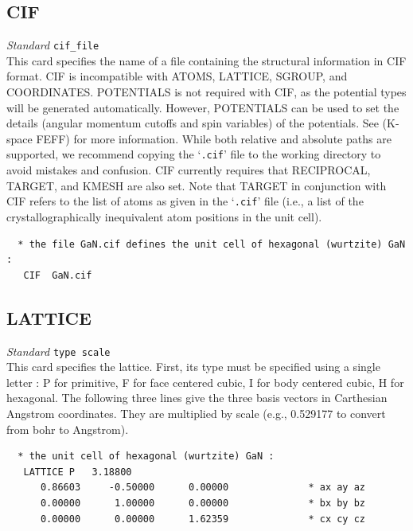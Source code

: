 \documentclass[11pt,oneside]{report} %
\newenvironment{Card}[4]%
      {\vspace{3ex}%
        \subsection{#1}
        \quad\textsl{#3}\newline
        \quad\texttt{#2}\newline%
        \label{card:#4}\\}
      {}
\newcommand{\file}[1]{`\texttt{#1}'}
\begin{document}
\begin{Card}{CIF}{cif\_file}{Standard}{cif}
This card specifies the name of a file containing the structural information in CIF format.  CIF is incompatible with ATOMS, LATTICE, SGROUP, and COORDINATES.  POTENTIALS is not required with CIF, as the potential types will be generated automatically.  However, POTENTIALS can be used to set the details (angular momentum cutoffs and spin variables) of the potentials.  See (K-space FEFF) for more information.
While both relative and absolute paths are supported, we recommend copying the \file{.cif} file to the working directory to avoid mistakes and confusion.
CIF currently requires that RECIPROCAL, TARGET, and KMESH are also set.  Note that TARGET in conjunction with CIF refers to the list of atoms as given in the \file{.cif} file (i.e., a list of the crystallographically inequivalent atom positions in the unit cell).
\begin{verbatim}
  * the file GaN.cif defines the unit cell of hexagonal (wurtzite) GaN :
   CIF  GaN.cif
\end{verbatim}
\end{Card}


\begin{Card}{LATTICE}{type scale}{Standard}{lat}
This card specifies the lattice.  First, its type must be specified using a single letter : P for primitive, F for face centered cubic, I for body centered cubic, H for hexagonal.  The following three lines give the three basis vectors in Carthesian Angstrom coordinates.  They are multiplied by scale (e.g., 0.529177 to convert from bohr to Angstrom).
\begin{verbatim}
  * the unit cell of hexagonal (wurtzite) GaN :
   LATTICE P   3.18800
      0.86603     -0.50000      0.00000              * ax ay az
      0.00000      1.00000      0.00000              * bx by bz
      0.00000      0.00000      1.62359              * cx cy cz
\end{verbatim}
\end{Card}
\end{document}
